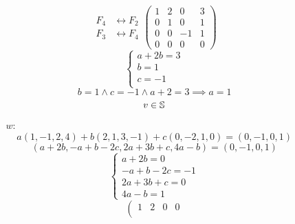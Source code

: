 \documentclass[../practica.root.tex]{subfiles}
\begin{document}
\begin{enumerate}
\begin{enumerate}
\begin{itemize}
\[\begin{array}{rl}
                                      F_4             & \leftrightarrow F_2 \\
                                      F_3             & \leftrightarrow F_4
                                  \end{array}
                                  \left(
                                  \begin{array}{ccc|c}
                                          1 & 2 & 0  & 3 \\
                                          0 & 1 & 0  & 1 \\
                                          0 & 0 & -1 & 1 \\
                                          0 & 0 & 0  & 0
                                      \end{array}
                                  \right)
                              \] \[
                                  \begin{cases}
                                      a + 2b = 3 \\
                                      b = 1      \\
                                      c = -1     \\
                                  \end{cases}
                              \]
                              \[ b = 1 \land c = -1 \land a + 2 = 3 \implies a = 1 \]
                              \[ v \in \S \]
                        \item[$w$:] \[ a(1,-1,2,4) + b(2,1,3,-1) + c(0,-2,1,0) = (0,-1,0,1) \]
                              \[ (a + 2b, -a + b -2c, 2a + 3b + c, 4a - b) = (0,-1,0,1) \]
                              \[
                                  \begin{cases}
                                      a + 2b = 0      \\
                                      -a + b -2c = -1 \\
                                      2a + 3b +c = 0  \\
                                      4a - b = 1
                                  \end{cases}
                              \] \[
                                  \left(
                                  \begin{array}{ccc|c}
                                          1  & 2  & 0  & 0  \\

\end{array}\]
\end{itemize}
\end{enumerate}
\end{enumerate}
\end{document}
